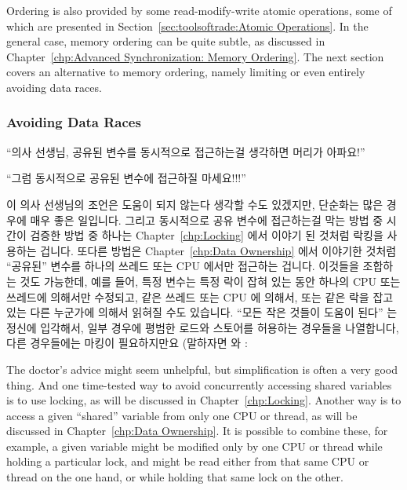 {{{{Ordering is also provided by some read-modify-write atomic
operations, some of which are presented in
Section~\ref{sec:toolsoftrade:Atomic Operations}.
In the general case, memory ordering can be quite subtle, as
discussed in
Chapter~\ref{chp:Advanced Synchronization: Memory Ordering}.
The next section covers an alternative to memory ordering, namely
limiting or even entirely avoiding data races.
\fi

\subsubsection{Avoiding Data Races}
\label{sec:toolsoftrade:Avoiding Data Races}

``의사 선생님, 공유된 변수를 동시적으로 접근하는걸 생각하면 머리가 아파요!''

``그럼 동시적으로 공유된 변수에 접근하질 마세요!!!''

이 의사 선생님의 조언은 도움이 되지 않는다 생각할 수도 있겠지만, 단순화는 많은
경우에 매우 좋은 일입니다.
그리고 동시적으로 공유 변수에 접근하는걸 막는 방법 중 시간이 검증한 방법 중
하나는 Chapter~\ref{chp:Locking} 에서 이야기 된 것처럼 락킹을 사용하는 겁니다.
또다른 방법은 Chapter~\ref{chp:Data Ownership} 에서 이야기한 것처럼 ``공유된''
변수를 하나의 쓰레드 또는 CPU 에서만 접근하는 겁니다.
이것들을 조합하는 것도 가능한데, 예를 들어, 특정 변수는 특정 락이 잡혀 있는
동안 하나의 CPU 또는 쓰레드에 의해서만 수정되고, 같은 쓰레드 또는 CPU 에
의해서, 또는 같은 락을 잡고 있는 다른 누군가에 의해서 읽혀질 수도 있습니다.
``모든 작은 것들이 도움이 된다'' 는 정신에 입각해서, 일부 경우에 평범한 로드와
스토어를 허용하는 경우들을 나열합니다, 다른 경우들에는 마킹이 필요하지만요
(말하자면  와 :
\iffalse

The doctor's advice might seem unhelpful, but simplification is often
a very good thing.
And one time-tested way to avoid concurrently accessing shared variables
is to use locking, as will be discussed in
Chapter~\ref{chp:Locking}.
Another way is to access a given ``shared'' variable from only one
CPU or thread, as will be discussed in
Chapter~\ref{chp:Data Ownership}.
It is possible to combine these, for example, a given variable might
be modified only by one CPU or thread while holding a particular lock,
and might be read either from that same CPU or thread on the one hand,
or while holding that same lock on the other.

}}}}
